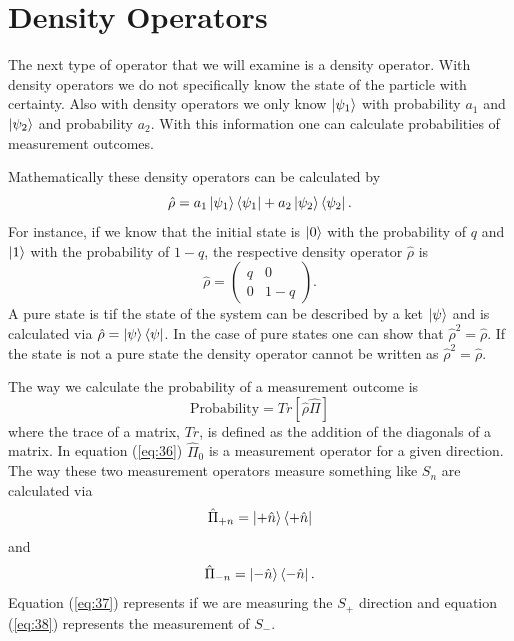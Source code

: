 \documentclass[twocolumn]{article}
\begin{document}
\section*{Density Operators}
The next type of operator that we will examine is a density operator. With density operators we do not specifically know the state of the particle with certainty. Also with density operators we only know $\ket{\psi_1}$ with probability $a_1$ and $\ket{\psi_2}$ and probability $a_2$. With this information one can calculate probabilities of measurement outcomes. 

Mathematically these density operators can be calculated by
\begin{equation} \label{eq:34}
\hat{\rho}=a_1\ket{\psi_1}\bra{\psi_1}+a_2\ket{\psi_2}\bra{\psi_2}.
\end{equation}
For instance, if we know that the initial state is $\ket{0}$ with the probability of $q$ and $\ket{1}$ with the probability of $1-q$, the respective density operator $\hat{\rho}$ is
\begin{equation} \label{eq:35}
\hat{\rho}=
\begin{pmatrix}
q & 0 \\
0 & 1-q
\end{pmatrix}.
\end{equation}
A pure state is tif the state of the system can be described by a ket $\ket{\psi}$ and is calculated via $\hat{\rho}=\ket{\psi}\bra{\psi}$. In the case of pure states one can show that $\hat{\rho}^2=\hat{\rho}$. If the state is not a pure state the density operator cannot be written as $\hat{\rho}^2=\hat{\rho}$. 

The way we calculate the probability of a measurement outcome is
\begin{equation} \label{eq:36}
\text{Probability}=Tr[\hat{\rho}\hat{\Pi}]
\end{equation}
where the trace of a matrix, $Tr$, is defined as the addition of the diagonals of a matrix. In equation (\ref{eq:36}) $\hat{\Pi}_0$ is a measurement operator for a given direction. The way these two measurement operators measure something like $S_n$ are calculated via
\begin{equation}\label{eq:37}
\hat{\Pi}_{+n}=\ket{+\hat{n}}\bra{+\hat{n}}
\end{equation}
and
\begin{equation}\label{eq:38}
\hat{\Pi}_{-n}=\ket{-\hat{n}}\bra{-\hat{n}}.
\end{equation}
Equation (\ref{eq:37}) represents if we are measuring the $S_+$ direction and equation (\ref{eq:38}) represents the measurement of $S_-$.
\end{document}

